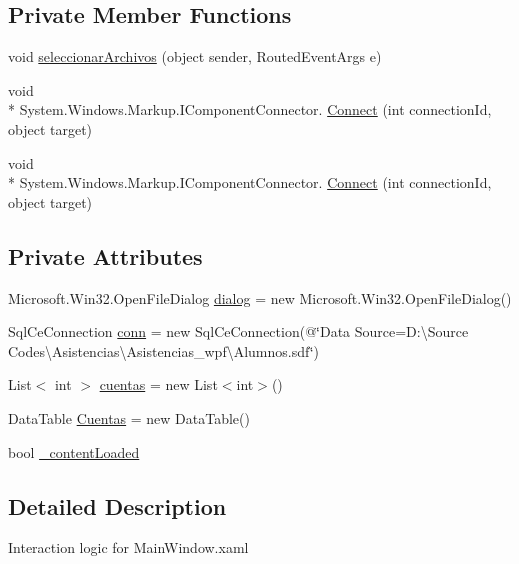 \subsection*{Private Member Functions}
\begin{DoxyCompactItemize}
\item 
void \hyperlink{class_importar_cuentas__wpf_1_1_main_window_a47d57c9710448d4a830aac55d5ece340}{seleccionar\-Archivos} (object sender, Routed\-Event\-Args e)
\item 
void \\*
System.\-Windows.\-Markup.\-I\-Component\-Connector. \hyperlink{class_importar_cuentas__wpf_1_1_main_window_a498ef0b3a1e4ad07b7966ca87cf1aa4f}{Connect} (int connection\-Id, object target)
\item 
void \\*
System.\-Windows.\-Markup.\-I\-Component\-Connector. \hyperlink{class_importar_cuentas__wpf_1_1_main_window_a498ef0b3a1e4ad07b7966ca87cf1aa4f}{Connect} (int connection\-Id, object target)
\end{DoxyCompactItemize}
\subsection*{Private Attributes}
\begin{DoxyCompactItemize}
\item 
Microsoft.\-Win32.\-Open\-File\-Dialog \hyperlink{class_importar_cuentas__wpf_1_1_main_window_ac1846e4ecd501ff338ad87a7c7bcb254}{dialog} = new Microsoft.\-Win32.\-Open\-File\-Dialog()
\item 
Sql\-Ce\-Connection \hyperlink{class_importar_cuentas__wpf_1_1_main_window_a8ed2f7c907bc1c8faf75d8deb555d137}{conn} = new Sql\-Ce\-Connection(@\char`\"{}Data Source=D\-:\textbackslash{}\-Source Codes\textbackslash{}\-Asistencias\textbackslash{}\-Asistencias\-\_\-wpf\textbackslash{}\-Alumnos.\-sdf\char`\"{})
\item 
List$<$ int $>$ \hyperlink{class_importar_cuentas__wpf_1_1_main_window_a17d2ae4fd8ca55fcbe57fef1133d360a}{cuentas} = new List$<$int$>$()
\item 
Data\-Table \hyperlink{class_importar_cuentas__wpf_1_1_main_window_a369b619d35d8f1d9ab8d57aa262f9111}{Cuentas} = new Data\-Table()
\item 
bool \hyperlink{class_importar_cuentas__wpf_1_1_main_window_a5548a0e1f3adfe66ff77765ca2907d56}{\-\_\-content\-Loaded}
\end{DoxyCompactItemize}


\subsection{Detailed Description}
Interaction logic for Main\-Window.\-xaml 

